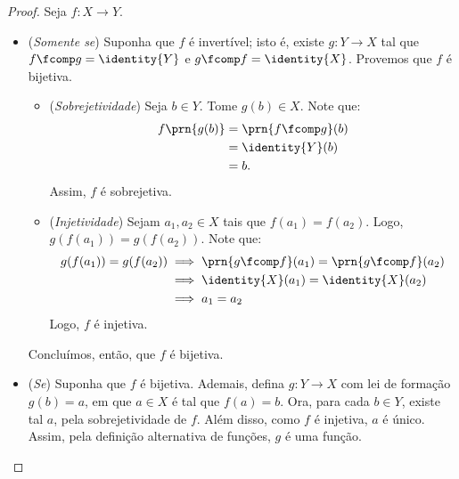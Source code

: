\begin{proof}
    Seja  $f: X \to Y$.
    \begin{itemize}
        \item (\emph{Somente se}) Suponha que $f$ é invertível; isto é, existe $g : Y \to X$ tal que $f \fcomp g = \identity{Y}$ e $g \fcomp f = \identity{X}$.
        Provemos que $f$ é bijetiva. 
        \begin{itemize}
            \item (\emph{Sobrejetividade}) Seja $b \in Y$.
            Tome $g(b)\in X$.
            Note que:
            \begin{align*}
                f\prn{g(b)} &= \prn{f \fcomp g}(b) \\ &= \identity{Y}(b) \\ &= b.
            \end{align*}
            Assim, $f$ é sobrejetiva.
            \item (\emph{Injetividade}) Sejam $a_1, a_2 \in X$ tais que $f(a_1)=f(a_2)$.
            Logo, $g(f(a_1))=g(f(a_2))$.
            Note que:
            \begin{align*}
                g(f(a_1))=g(f(a_2)) & \implies \prn{g \fcomp f}(a_1) = \prn{g \fcomp f}(a_2) \\
                & \implies \identity{X}(a_1) = \identity{X}(a_2) \\
                & \implies a_1 = a_2
            \end{align*}
            Logo, $f$ é injetiva.
        \end{itemize}
        Concluímos, então, que $f$ é bijetiva.

        \item (\emph{Se}) Suponha que $f$ é bijetiva.
        Ademais, defina $g: Y \to X$ com lei de formação $g(b)=a$, em que $a \in X$ é tal que $f(a)=b$.
        Ora, para cada $b \in Y$, existe tal $a$, pela sobrejetividade de $f$.
        Além disso, como $f$ é injetiva, $a$ é único. 
        Assim, pela definição alternativa de funções, $g$ é uma função.


\end{itemize}
\end{proof}
